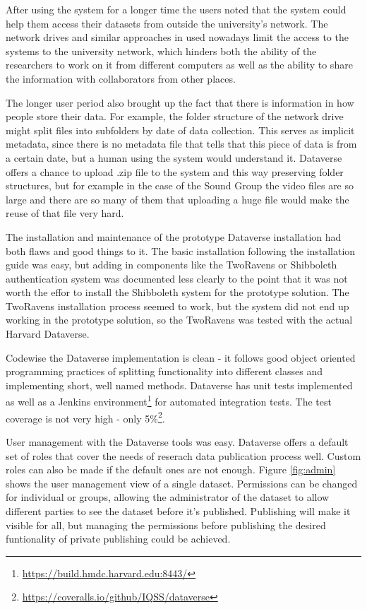 After using the system for a longer time the users noted that the system could
help them access their datasets from outside the university's network. The
network drives and similar approaches in used nowadays limit the access to
the systems to the university network, which hinders both the ability of the
researchers to work on it from different computers as well as the ability to
share the information with collaborators from other places.

The longer user period also brought up the fact that there is information in
how people store their data. For example, the folder structure of the network
drive might split files into subfolders by date of data collection. This serves
as implicit metadata, since there is no metadata file that tells that this
piece of data is from a certain date, but a human using the system would
understand it. Dataverse offers a chance to upload .zip file to the system
and this way preserving folder structures, but for example in the case of
the Sound Group the video files are so large and there are so many of them
that uploading a huge file would make the reuse of that file very hard.

The installation and maintenance of the prototype Dataverse installation had
both flaws and good things to it. The basic installation following the
installation guide was easy, but adding in components like the TwoRavens or
Shibboleth authentication system was documented less clearly to the point that
it was not worth the effor to install the Shibboleth system for the prototype
solution. The TwoRavens installation process seemed to work, but the system
did not end up working in the prototype solution, so the TwoRavens was tested
with the actual Harvard Dataverse.

Codewise the Dataverse implementation is clean - it follows good object
oriented programming practices of splitting functionality into different
classes and implementing short, well named methods. Dataverse has unit
tests implemented as well as a Jenkins
environment\footnote{\url{https://build.hmdc.harvard.edu:8443/}} for automated
integration tests. The test coverage is not very high - only
5\%\footnote{\url{https://coveralls.io/github/IQSS/dataverse}}.

User management with the Dataverse tools was easy. Dataverse offers a default
set of roles that cover the needs of reserach data publication process well.
Custom roles can also be made if the default ones are not enough. Figure
\ref{fig:admin} shows the user management view of a single dataset. Permissions
can be changed for individual or groups, allowing the administrator of the
dataset to allow different parties to see the dataset before it's published.
Publishing will make it visible for all, but managing the permissions before
publishing the desired funtionality of private publishing could be achieved.

